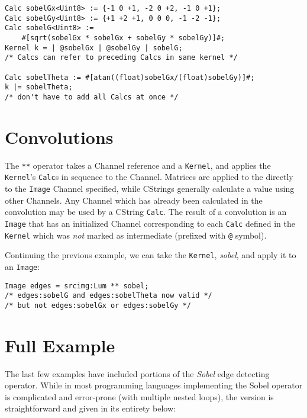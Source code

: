 \begin{lstlisting}[language=CLAM,escapechar=\%]
Calc sobelGx<Uint8> := {-1 0 +1, -2 0 +2, -1 0 +1};
Calc sobelGy<Uint8> := {+1 +2 +1, 0 0 0, -1 -2 -1};
Calc sobelG<Uint8> :=
    #[sqrt(sobelGx * sobelGx + sobelGy * sobelGy)]#;
Kernel k = | @sobelGx | @sobelGy | sobelG;
/* Calcs can refer to preceding Calcs in same kernel */

Calc sobelTheta := #[atan((float)sobelGx/(float)sobelGy)]#;
k |= sobelTheta; 
/* don't have to add all Calcs at once */
\end{lstlisting}

\section{Convolutions}\label{sec:tutorial:convolutions}

The \texttt{**} operator takes a Channel reference and a \texttt{Kernel}, and
applies the \texttt{Kernel}'s \texttt{Calc}s in sequence to the Channel.
Matrices are applied to the directly to the \texttt{Image} Channel specified,
while CStrings generally calculate a value using other Channels. Any Channel which has
already been calculated in the convolution may be used by a CString \texttt{Calc}.
The result of a convolution is an \texttt{Image} that has an initialized Channel corresponding to
each \texttt{Calc} defined in the \texttt{Kernel} which was \emph{not} marked as intermediate
(prefixed with \texttt{@} symbol).

Continuing the previous example, we can take the \texttt{Kernel}, \emph{sobel}, and apply it to an \texttt{Image}:

\begin{lstlisting}[language=CLAM,escapechar=\%]
Image edges = srcimg:Lum ** sobel;
/* edges:sobelG and edges:sobelTheta now valid */
/* but not edges:sobelGx or edges:sobelGy */
\end{lstlisting}

\clearpage
\section{Full Example}

The last few examples have included portions of the \emph{Sobel} edge detecting operator.
While in most programming languages implementing the Sobel operator
is complicated and error-prone (with multiple nested loops), the \sys{} version is straightforward and
given in its entirety below:




